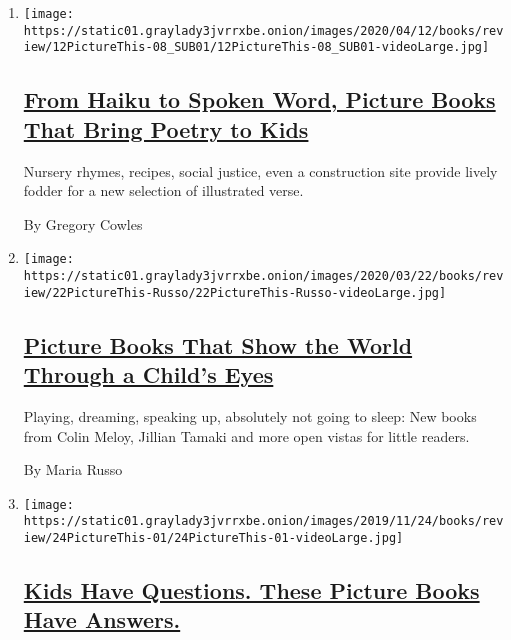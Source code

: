 \begin{enumerate}
\def\labelenumi{\arabic{enumi}.}
\item
  \texttt{[image: https://static01.graylady3jvrrxbe.onion/images/2020/04/12/books/review/12PictureThis-08\_SUB01/12PictureThis-08\_SUB01-videoLarge.jpg]}

  \hypertarget{from-haiku-to-spoken-word-picture-books-that-bring-poetry-to-kids}{%
  \subsection{\texorpdfstring{\href{/2020/04/10/books/review/picture-books-poetry.html}{From
  Haiku to Spoken Word, Picture Books That Bring Poetry to
  Kids}}{From Haiku to Spoken Word, Picture Books That Bring Poetry to Kids}}\label{from-haiku-to-spoken-word-picture-books-that-bring-poetry-to-kids}}

  Nursery rhymes, recipes, social justice, even a construction site
  provide lively fodder for a new selection of illustrated verse.

  By Gregory Cowles
\item
  \texttt{[image: https://static01.graylady3jvrrxbe.onion/images/2020/03/22/books/review/22PictureThis-Russo/22PictureThis-Russo-videoLarge.jpg]}

  \hypertarget{picture-books-that-show-the-world-through-a-childs-eyes}{%
  \subsection{\texorpdfstring{\href{/2020/03/20/books/review/picture-books-colin-meloy-jillian-tamaki-serge-bloch.html}{Picture
  Books That Show the World Through a Child's
  Eyes}}{Picture Books That Show the World Through a Child's Eyes}}\label{picture-books-that-show-the-world-through-a-childs-eyes}}

  Playing, dreaming, speaking up, absolutely not going to sleep: New
  books from Colin Meloy, Jillian Tamaki and more open vistas for little
  readers.

  By Maria Russo
\item
  \texttt{[image: https://static01.graylady3jvrrxbe.onion/images/2019/11/24/books/review/24PictureThis-01/24PictureThis-01-videoLarge.jpg]}

  \hypertarget{kids-have-questions-these-picture-books-have-answers}{%
  \subsection{\texorpdfstring{\href{/2019/11/22/books/review/isabelle-arsenault-grant-snider-little-libraries-picture-books.html}{Kids
  Have Questions. These Picture Books Have
  Answers.}}{Kids Have Questions. These Picture Books Have Answers.}}\label{kids-have-questions-these-picture-books-have-answers}}


\end{enumerate}
